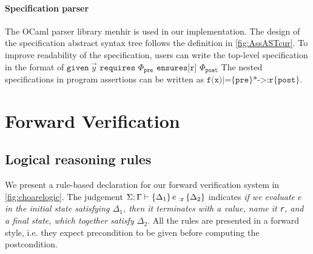 \paragraph{Specification parser} The OCaml parser library menhir is used in our implementation. The design of the specification abstract syntax tree follows the definition in \autoref{fig:AssASTcur}. To improve readability of the specification, users can write the top-level specification in the format of $\texttt{given} \ \vec{y} \texttt{ requires } \Phi_{\texttt{pre}} \texttt{ ensures[r] } \Phi_{\texttt{post}}$
The nested specifications in program assertions can be written as $\texttt{f(x)|=\{pre\}*->:r\{post\}}$. 




\section{Forward Verification}


\subsection{Logical reasoning rules}

We present a rule-based declaration for our forward verification system in \autoref{fig:choarelogic}. 
The judgement $\Sigma;\Gamma \vdash \{\Delta_1\}\,e\ _{:\texttt{\texttt{r}}}\left\{ {\Delta_2}\right\}$ indicates \emph{if we evaluate $e$ in the initial state satisfying $\Delta_1$, then it terminates with a value, name it \texttt{r}, and a final state, which together satisfy $\Delta_2$}. All the rules are presented in a forward style, i.e. they expect precondition to be given before computing the postcondition. 

